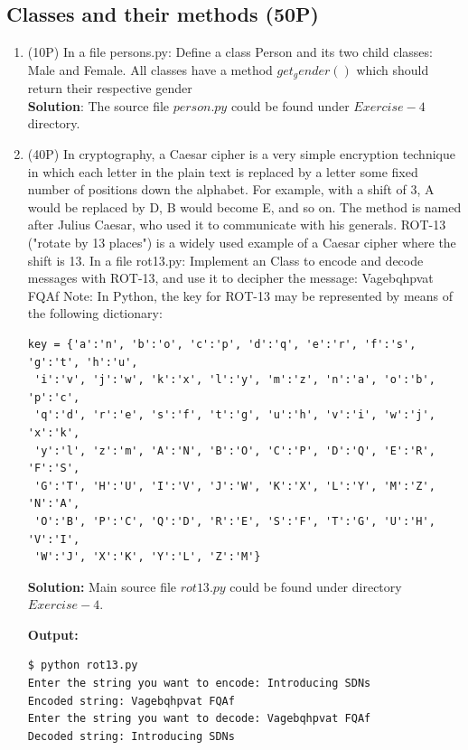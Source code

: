 \documentclass{llncs}
\begin{document}
\subsection{Classes and their methods (50P)} 
\begin{enumerate}
\item (10P) In a file persons.py: Define a class Person and its two child
classes: Male and Female. All classes have a method $get_gender()$ which
should return their respective gender \\
\textbf{Solution}: The source file $person.py$ could be found under
$Exercise-4$ directory.


\item (40P) In cryptography, a Caesar cipher is a very simple encryption
technique in which each letter in the plain text is replaced by a letter
some fixed number of positions down the alphabet. For example, with a shift
of 3, A would be replaced by D, B would become E, and so on. The method is
named after Julius Caesar, who used it to communicate with his generals.
ROT-13 ("rotate by 13 places") is a widely used example of a Caesar cipher
where the shift is 13. In a file rot13.py: Implement an Class to encode and
decode messages with ROT-13, and use it to decipher the message: Vagebqhpvat 
FQAf
Note: In Python, the key for ROT-13 may be represented by means of the
following dictionary:
\begin{verbatim}
key = {'a':'n', 'b':'o', 'c':'p', 'd':'q', 'e':'r', 'f':'s', 'g':'t', 'h':'u',
 'i':'v', 'j':'w', 'k':'x', 'l':'y', 'm':'z', 'n':'a', 'o':'b', 'p':'c',
 'q':'d', 'r':'e', 's':'f', 't':'g', 'u':'h', 'v':'i', 'w':'j', 'x':'k',
 'y':'l', 'z':'m', 'A':'N', 'B':'O', 'C':'P', 'D':'Q', 'E':'R', 'F':'S',
 'G':'T', 'H':'U', 'I':'V', 'J':'W', 'K':'X', 'L':'Y', 'M':'Z', 'N':'A',
 'O':'B', 'P':'C', 'Q':'D', 'R':'E', 'S':'F', 'T':'G', 'U':'H', 'V':'I',
 'W':'J', 'X':'K', 'Y':'L', 'Z':'M'}
\end{verbatim}
\subitem \textbf{Solution: } Main source file $rot13.py$ could be found 
under directory $Exercise-4$.

\textbf{Output: }
\begin{lstlisting}
$ python rot13.py                                                                                                                                                                        
Enter the string you want to encode: Introducing SDNs
Encoded string: Vagebqhpvat FQAf
Enter the string you want to decode: Vagebqhpvat FQAf
Decoded string: Introducing SDNs
\end{lstlisting}
\end{enumerate}
\end{document}
